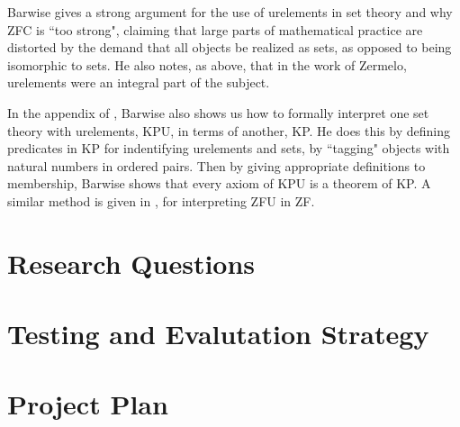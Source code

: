\documentclass[12pt]{article}
\begin{document}
Barwise \cite{barwise} gives a strong argument for the use of urelements in set theory and why ZFC is ``too strong", claiming that large parts of mathematical practice are distorted by the demand that all objects be realized as sets, as opposed to being isomorphic to sets. He also notes, as above, that in the work of Zermelo, urelements were an integral part of the subject.

In the appendix of \cite{barwise}, Barwise also shows us how to formally interpret one set theory with urelements, KPU, in terms of another, KP. He does this by defining predicates in KP for indentifying urelements and sets, by ``tagging" objects with natural numbers in ordered pairs. %
Then by giving appropriate definitions to membership, Barwise shows that every axiom of KPU is a theorem of KP. A similar method is given in \cite{lowe}, for interpreting ZFU in ZF.
\section{Research Questions}


\section{Testing and Evalutation Strategy}


\section{Project Plan}

\end{document}
